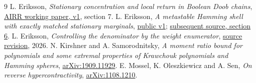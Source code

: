 \documentclass[11pt]{article}
\begin{document}
\begin{thebibliography}{9}
 L. Eriksson, \emph{Stationary concentration and local return in Boolean Doob chains}, \href{https://airr.science/papers/ARR-2026-2SH3CGGBHG9Q5BYN/versions/v1/}{AIRR working paper, v1}, section 7.
 L. Eriksson, \emph{A metastable Hamming shell with exactly matched stationary marginals}, \href{https://airr.science/papers/ARR-2026-2B2W1WQ7DF9N5VW7/versions/v1/}{public v1}; \href{https://github.com/lluiseriksson/THE-ERIKSSON-PROGRAMME/blob/1b24d36de2f0596e915fc605a86d52dc25bdf8c8/papers/stationary-weighting354/research/2026-11-18-small-support/metastable-shell-v2.tex}{subsequent source, section 6}.
 L. Eriksson, \emph{Controlling the denominator by the weight enumerator}, \href{https://github.com/lluiseriksson/THE-ERIKSSON-PROGRAMME/blob/0fa67e0bb0636fad345c58da03d9426c05d4deca/papers/stationary-weighting354/research/2026-11-18-small-support/enumerator-denominator.tex}{source revision}, 2026.
 N. Kirshner and A. Samorodnitsky, \emph{A moment ratio bound for polynomials and some extremal properties of Krawchouk polynomials and Hamming spheres}, \href{https://arxiv.org/abs/1909.11929}{arXiv:1909.11929}.
 E. Mossel, K. Oleszkiewicz and A. Sen, \emph{On reverse hypercontractivity}, \href{https://arxiv.org/abs/1108.1210}{arXiv:1108.1210}.
\end{thebibliography}
\end{document}

